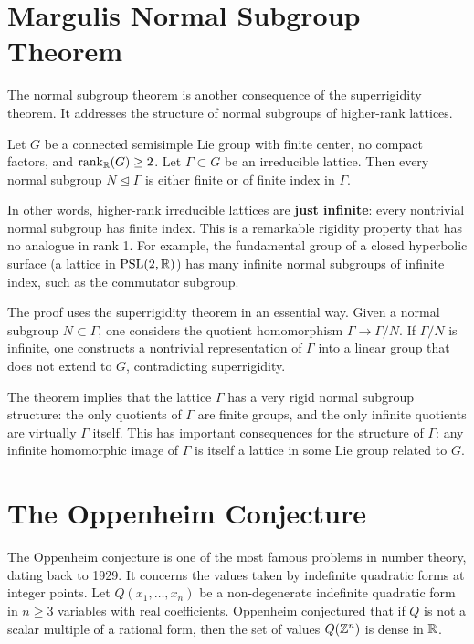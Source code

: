 \section{Margulis Normal Subgroup Theorem}

The normal subgroup theorem is another consequence of the superrigidity theorem. It addresses the structure of normal subgroups of higher-rank lattices.

\begin{theorem}
Let \(G\) be a connected semisimple Lie group with finite center, no compact factors, and \(\rank_{\mathbb{R}}(G) \geq 2\). Let \(\Gamma \subset G\) be an irreducible lattice. Then every normal subgroup \(N \trianglelefteq \Gamma\) is either finite or of finite index in \(\Gamma\).
\end{theorem}

In other words, higher-rank irreducible lattices are \textbf{just infinite}: every nontrivial normal subgroup has finite index. This is a remarkable rigidity property that has no analogue in rank 1. For example, the fundamental group of a closed hyperbolic surface (a lattice in \(\operatorname{PSL}(2,\mathbb{R})\)) has many infinite normal subgroups of infinite index, such as the commutator subgroup.

The proof uses the superrigidity theorem in an essential way. Given a normal subgroup \(N \subset \Gamma\), one considers the quotient homomorphism \(\Gamma \to \Gamma/N\). If \(\Gamma/N\) is infinite, one constructs a nontrivial representation of \(\Gamma\) into a linear group that does not extend to \(G\), contradicting superrigidity.

The theorem implies that the lattice \(\Gamma\) has a very rigid normal subgroup structure: the only quotients of \(\Gamma\) are finite groups, and the only infinite quotients are virtually \(\Gamma\) itself. This has important consequences for the structure of \(\Gamma\): any infinite homomorphic image of \(\Gamma\) is itself a lattice in some Lie group related to \(G\).

\section{The Oppenheim Conjecture}

The Oppenheim conjecture is one of the most famous problems in number theory, dating back to 1929. It concerns the values taken by indefinite quadratic forms at integer points. Let \(Q(x_1,\dots,x_n)\) be a non-degenerate indefinite quadratic form in \(n \geq 3\) variables with real coefficients. Oppenheim conjectured that if \(Q\) is not a scalar multiple of a rational form, then the set of values \(Q(\mathbb{Z}^n)\) is dense in \(\mathbb{R}\).

